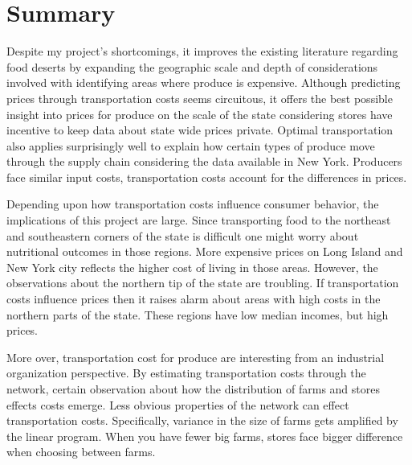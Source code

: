 \documentclass{report}
\begin{document}
\section{Summary}

Despite my project's shortcomings, it improves the existing literature regarding food deserts by expanding the geographic scale and depth of considerations involved with identifying areas where produce is expensive. Although predicting prices through transportation costs seems circuitous, it offers the best possible insight into prices for produce on the scale of the state considering stores have incentive to keep data about state wide prices private. Optimal transportation also applies surprisingly well to explain how certain types of produce move through the supply chain considering the data available in New York. Producers face similar input costs, transportation costs account for the differences in prices.

Depending upon how transportation costs influence consumer behavior, the implications of this project are large. Since transporting food to the northeast and southeastern corners of the state is difficult one might worry about nutritional outcomes in those regions. More expensive prices on Long Island and New York city reflects the higher cost of living in those areas. However, the observations about the northern tip of the state are troubling. If transportation costs influence prices then it raises alarm about areas with high costs in the northern parts of the state. These regions have low median incomes, but high prices.

More over, transportation cost for produce are interesting from an industrial organization perspective. By estimating transportation costs through the network, certain observation about how the distribution of farms and stores effects costs emerge. Less obvious properties of the network can effect transportation costs. Specifically, variance in the size of farms gets amplified by the linear program. When you have fewer big farms, stores face bigger difference when choosing between farms.


\pagebreak
\end{document}
